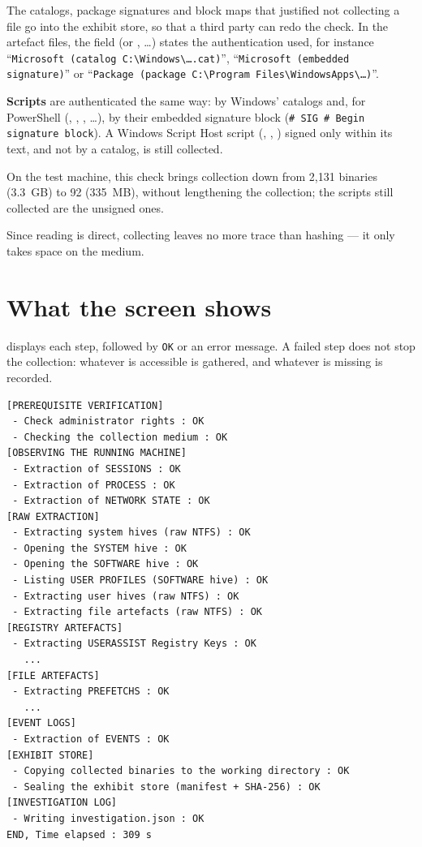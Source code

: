 \documentclass[11pt,a4paper,oneside]{report}
\begin{document}
The catalogs, package signatures and block maps that justified not collecting a
file go into the exhibit store, so that a third party can redo the check. In
the artefact files, the  field (or ,
\ldots) states the authentication used, for instance
``\texttt{Microsoft (catalog C:\textbackslash{}Windows\textbackslash{}\ldots.cat)}'',
``\texttt{Microsoft (embedded signature)}'' or
``\texttt{Package (package C:\textbackslash{}Program Files\textbackslash{}WindowsApps\textbackslash{}\ldots)}''.

\textbf{Scripts} are authenticated the same way: by Windows' catalogs and, for
PowerShell (, , ,
\ldots), by their embedded signature block
(\texttt{\# SIG \# Begin signature block}). A Windows Script Host script
(, , ) signed only within its text, and
not by a catalog, is still collected.

On the test machine, this check brings collection down from 2,131 binaries
(3.3~GB) to 92 (335~MB), without lengthening the collection; the scripts still
collected are the unsigned ones.

Since reading is direct, collecting leaves no more trace than hashing — it only
takes space on the medium.

\section{What the screen shows}

\wac{} displays each step, followed by \texttt{OK} or an error message. A failed
step does not stop the collection: whatever is accessible is gathered, and
whatever is missing is recorded.

\begin{lstlisting}
[PREREQUISITE VERIFICATION]
 - Check administrator rights : OK
 - Checking the collection medium : OK
[OBSERVING THE RUNNING MACHINE]
 - Extraction of SESSIONS : OK
 - Extraction of PROCESS : OK
 - Extraction of NETWORK STATE : OK
[RAW EXTRACTION]
 - Extracting system hives (raw NTFS) : OK
 - Opening the SYSTEM hive : OK
 - Opening the SOFTWARE hive : OK
 - Listing USER PROFILES (SOFTWARE hive) : OK
 - Extracting user hives (raw NTFS) : OK
 - Extracting file artefacts (raw NTFS) : OK
[REGISTRY ARTEFACTS]
 - Extracting USERASSIST Registry Keys : OK
   ...
[FILE ARTEFACTS]
 - Extracting PREFETCHS : OK
   ...
[EVENT LOGS]
 - Extraction of EVENTS : OK
[EXHIBIT STORE]
 - Copying collected binaries to the working directory : OK
 - Sealing the exhibit store (manifest + SHA-256) : OK
[INVESTIGATION LOG]
 - Writing investigation.json : OK
END, Time elapsed : 309 s
\end{lstlisting}
\end{document}

